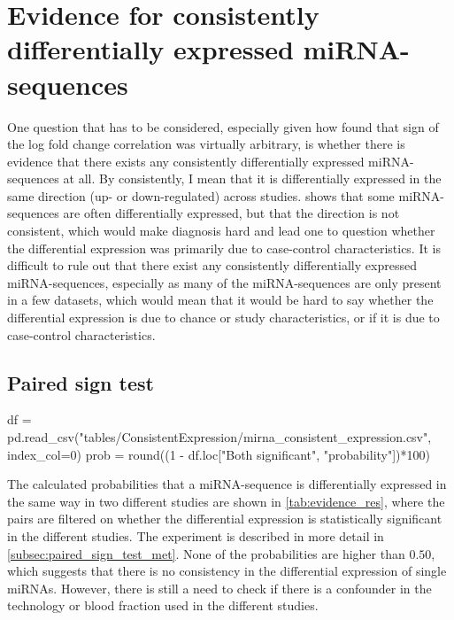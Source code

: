 {{\section{Evidence for consistently differentially expressed miRNA-sequences}
\label{sec:res_evidence_consistently_differentially}
One question that has to be considered, especially given how \citet{forprosjekt} found that sign of the log fold change correlation was virtually arbitrary, is whether there is evidence that there exists any consistently differentially expressed miRNA-sequences at all. By consistently, I mean that it is differentially expressed in the same direction (up- or down-regulated) across studies.  shows that some miRNA-sequences are often differentially expressed, but that the direction is not consistent, which would make diagnosis hard and lead one to question whether the differential expression was primarily due to case-control characteristics. It is difficult to rule out that there exist any consistently differentially expressed miRNA-sequences, especially as many of the miRNA-sequences are only present in a few datasets, which would mean that it would be hard to say whether the differential expression is due to chance or study characteristics, or if it is due to case-control characteristics.

\subsection{Paired sign test}
\label{subsec:paired_sign_test_res}

\begin{pycode}
df = pd.read_csv("tables/ConsistentExpression/mirna_consistent_expression.csv", index_col=0)
prob = round((1 - df.loc["Both significant", "probability"])*100)
\end{pycode}
The calculated probabilities that a miRNA-sequence is differentially expressed in the same way in two different studies are shown in \autoref{tab:evidence_res}, where the pairs are filtered on whether the differential expression is statistically significant in the different studies. The experiment is described in more detail in \autoref{subsec:paired_sign_test_met}. None of the probabilities are higher than $0.50$, which suggests that there is no consistency in the differential expression of single miRNAs. However, there is still a need to check if there is a confounder in the technology or blood fraction used in the different studies.

}}
